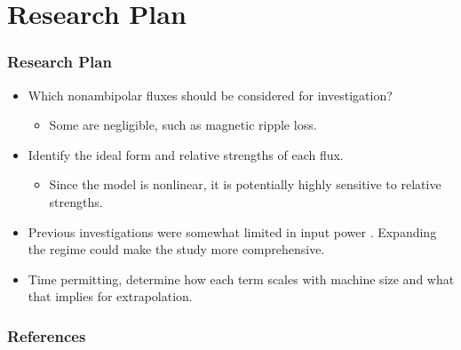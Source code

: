 \documentclass{beamer}
\begin{document}

\section{Research Plan}
\begin{frame}
\frametitle{Research Plan}
\begin{itemize}
	\item Which nonambipolar fluxes should be considered for investigation?
	\begin{itemize}
		\item Some are negligible, such as magnetic ripple loss.
	\end{itemize}
	\item Identify the ideal form and relative strengths of each flux.
	\begin{itemize}
		\item Since the model is nonlinear, it is potentially highly sensitive to relative strengths.
	\end{itemize}
	\item Previous investigations were somewhat limited in input power \cite{staps_backstepping_2017}. Expanding the regime could make the study more comprehensive.
	\item Time permitting, determine how each term scales with machine size and what that implies for extrapolation.
\end{itemize}
\end{frame}


\begin{frame}
\frametitle{References}
\renewcommand*{\bibfont}{\tiny}
\printbibliography
\end{frame}
\end{document}
